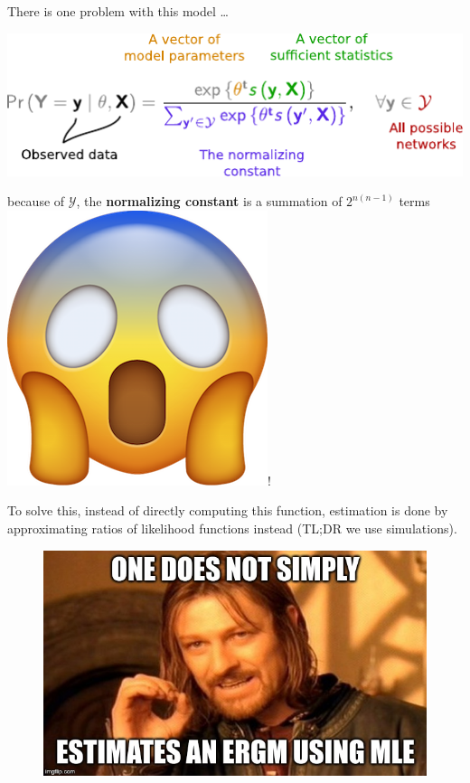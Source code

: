 \documentclass[10pt,ignorenonframetext,handout,aspectratio=169,]{beamer}
\newcommand{\GRAPH}{\mathcal{Y}}
\begin{document}
\begin{frame}

\centering

There is one problem with this model \ldots{}

\includegraphics[width = .5\linewidth]{fig/parts-of-ergm.pdf}\pause

\large because of \color[HTML]{af0000}\(\GRAPH\)\color{black}, the
\color[HTML]{5726e7} \textbf{normalizing constant}\color{black}{} is
\linebreak[4] a summation of \(2^{n(n-1)}\) terms
\includegraphics[width=.05\linewidth]{fig/scared.png}!\normalsize\pause

\end{frame}

\begin{frame}

To solve this, instead of directly computing this function, estimation
is done by approximating ratios of likelihood functions instead (TL;DR
we use simulations).

\begin{figure}
\includegraphics[width=.6\linewidth]{fig/simply-not.jpg}
\end{figure}

\end{frame}
\end{document}
